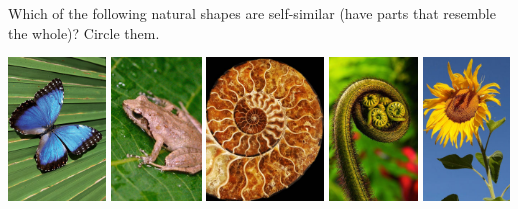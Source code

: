 Which of the following natural shapes are self-similar (have parts that resemble the whole)? Circle them.

\begin{center}
\includegraphics[height=1.5in]{images/butterfly}\hfill
\includegraphics[height=1.5in]{images/frog}\hfill
\includegraphics[height=1.5in]{images/nautilus}\hfill
\includegraphics[height=1.5in]{images/spiralHead}\hfill
\includegraphics[height=1.5in]{images/sunflower}
\end{center}

\wbnewpage
